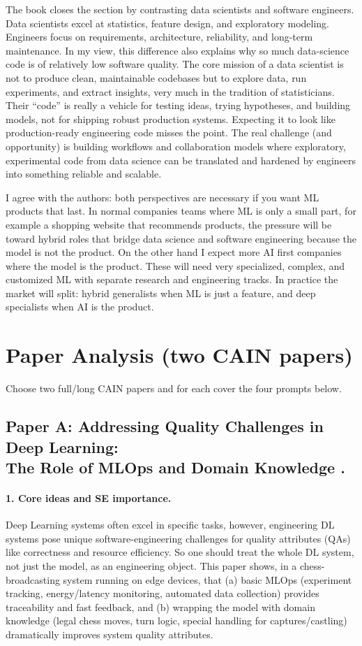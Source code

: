 \documentclass[11pt,a4paper]{article}
\begin{document}
The book closes the section by contrasting data scientists and software engineers. Data scientists excel at statistics, feature design, and exploratory modeling. Engineers focus on requirements, architecture, reliability, and long-term maintenance. In my view, this difference also explains why so much data-science code is of relatively low software quality. The core mission of a data scientist is not to produce clean, maintainable codebases but to explore data, run experiments, and extract insights, very much in the tradition of statisticians. Their “code” is really a vehicle for testing ideas, trying hypotheses, and building models, not for shipping robust production systems. Expecting it to look like production-ready engineering code misses the point. The real challenge (and opportunity) is building workflows and collaboration models where exploratory, experimental code from data science can be translated and hardened by engineers into something reliable and scalable.

I agree with the authors: both perspectives are necessary if you want ML products that last. In normal companies teams where ML is only a small part, for example a shopping website that recommends products, the pressure will be toward hybrid roles that bridge data science and software engineering because the model is not the product. On the other hand I expect more AI first companies where the model is the product. These will need very specialized, complex, and customized ML with separate research and engineering tracks. In practice the market will split: hybrid generalists when ML is just a feature, and deep specialists when AI is the product.

\section{Paper Analysis (two CAIN papers)}
Choose two full/long CAIN papers and for each cover the four prompts below.

\subsection{Paper A: Addressing Quality Challenges in Deep Learning: \\ The Role of MLOps and Domain Knowledge \cite{cainB}.}
\paragraph{1. Core ideas and SE importance.}
Deep Learning systems often excel in specific tasks, however, engineering DL systems pose unique software-engineering challenges for quality attributes (QAs) like correctness and resource efficiency. So one should treat the whole DL system, not just the model, as an engineering object. This paper shows, in a chess-broadcasting system running on edge devices, that (a) basic MLOps (experiment tracking, energy/latency monitoring, automated data collection) provides traceability and fast feedback, and (b) wrapping the model with domain knowledge (legal chess moves, turn logic, special handling for captures/castling) dramatically improves system quality attributes.
\end{document}
